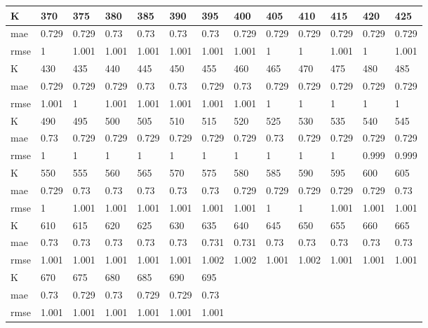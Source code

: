 \begin{appendices}
\begin{center}
\begin{tabularx}{\textwidth}{|l|X|X|X|X|X|X|X|X|X|X|X|X|}
		\hline 
		K & 370 & 375 & 380 & 385 & 390 & 395 & 400 & 405 & 410 & 415 & 420 & 425 \\ \hline 
		mae & 0.729 & 0.729 & 0.73 & 0.73 & 0.73 & 0.73 & 0.729 & 0.729 & 0.729 & 0.729 & 0.729 & 0.729 \\ \hline 
		rmse & 1 & 1.001 & 1.001 & 1.001 & 1.001 & 1.001 & 1.001 & 1 & 1 & 1.001 & 1 & 1.001 \\ \hline 
		\hline 
		K & 430 & 435 & 440 & 445 & 450 & 455 & 460 & 465 & 470 & 475 & 480 & 485 \\ \hline 
		mae & 0.729 & 0.729 & 0.729 & 0.73 & 0.73 & 0.729 & 0.73 & 0.729 & 0.729 & 0.729 & 0.729 & 0.729 \\ \hline 
		rmse & 1.001 & 1 & 1.001 & 1.001 & 1.001 & 1.001 & 1.001 & 1 & 1 & 1 & 1 & 1 \\ \hline 
		\hline 
		K & 490 & 495 & 500 & 505 & 510 & 515 & 520 & 525 & 530 & 535 & 540 & 545 \\ \hline 
		mae & 0.73 & 0.729 & 0.729 & 0.729 & 0.729 & 0.729 & 0.729 & 0.73 & 0.729 & 0.729 & 0.729 & 0.729 \\ \hline 
		rmse & 1 & 1 & 1 & 1 & 1 & 1 & 1 & 1 & 1 & 1 & 0.999 & 0.999 \\ \hline 
		\hline 
		K & 550 & 555 & 560 & 565 & 570 & 575 & 580 & 585 & 590 & 595 & 600 & 605 \\ \hline 
		mae & 0.729 & 0.73 & 0.73 & 0.73 & 0.73 & 0.73 & 0.729 & 0.729 & 0.729 & 0.729 & 0.729 & 0.73 \\ \hline 
		rmse & 1 & 1.001 & 1.001 & 1.001 & 1.001 & 1.001 & 1.001 & 1 & 1 & 1.001 & 1.001 & 1.001 \\ \hline 
		\hline 
		K & 610 & 615 & 620 & 625 & 630 & 635 & 640 & 645 & 650 & 655 & 660 & 665 \\ \hline 
		mae & 0.73 & 0.73 & 0.73 & 0.73 & 0.73 & 0.731 & 0.731 & 0.73 & 0.73 & 0.73 & 0.73 & 0.73 \\ \hline 
		rmse & 1.001 & 1.001 & 1.001 & 1.001 & 1.001 & 1.002 & 1.002 & 1.001 & 1.002 & 1.001 & 1.001 & 1.001 \\ \hline 
		\hline 
		K & 670 & 675 & 680 & 685 & 690 & 695  & & & & & & \\ \hline 
		mae & 0.73 & 0.729 & 0.73 & 0.729 & 0.729 & 0.73 & & & & & &  \\ \hline 
		rmse & 1.001 & 1.001 & 1.001 & 1.001 & 1.001 & 1.001  & & & & & & \\ \hline 
	\end{tabularx} 
\end{center}



\end{appendices}
